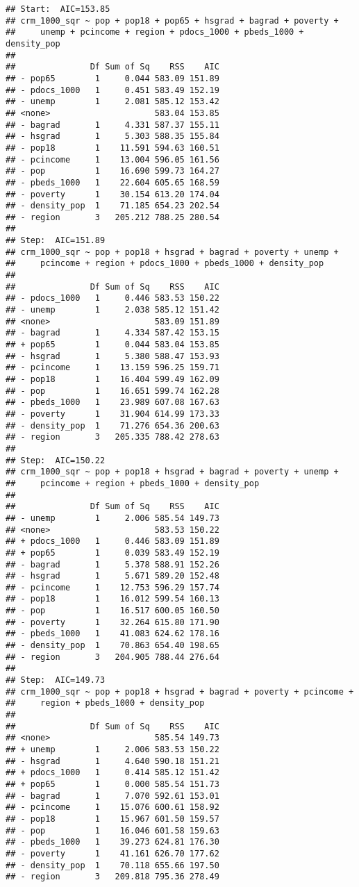 \documentclass[
]{article}
\begin{document}
\begin{verbatim}
## Start:  AIC=153.85
## crm_1000_sqr ~ pop + pop18 + pop65 + hsgrad + bagrad + poverty + 
##     unemp + pcincome + region + pdocs_1000 + pbeds_1000 + density_pop
## 
##               Df Sum of Sq    RSS    AIC
## - pop65        1     0.044 583.09 151.89
## - pdocs_1000   1     0.451 583.49 152.19
## - unemp        1     2.081 585.12 153.42
## <none>                     583.04 153.85
## - bagrad       1     4.331 587.37 155.11
## - hsgrad       1     5.303 588.35 155.84
## - pop18        1    11.591 594.63 160.51
## - pcincome     1    13.004 596.05 161.56
## - pop          1    16.690 599.73 164.27
## - pbeds_1000   1    22.604 605.65 168.59
## - poverty      1    30.154 613.20 174.04
## - density_pop  1    71.185 654.23 202.54
## - region       3   205.212 788.25 280.54
## 
## Step:  AIC=151.89
## crm_1000_sqr ~ pop + pop18 + hsgrad + bagrad + poverty + unemp + 
##     pcincome + region + pdocs_1000 + pbeds_1000 + density_pop
## 
##               Df Sum of Sq    RSS    AIC
## - pdocs_1000   1     0.446 583.53 150.22
## - unemp        1     2.038 585.12 151.42
## <none>                     583.09 151.89
## - bagrad       1     4.334 587.42 153.15
## + pop65        1     0.044 583.04 153.85
## - hsgrad       1     5.380 588.47 153.93
## - pcincome     1    13.159 596.25 159.71
## - pop18        1    16.404 599.49 162.09
## - pop          1    16.651 599.74 162.28
## - pbeds_1000   1    23.989 607.08 167.63
## - poverty      1    31.904 614.99 173.33
## - density_pop  1    71.276 654.36 200.63
## - region       3   205.335 788.42 278.63
## 
## Step:  AIC=150.22
## crm_1000_sqr ~ pop + pop18 + hsgrad + bagrad + poverty + unemp + 
##     pcincome + region + pbeds_1000 + density_pop
## 
##               Df Sum of Sq    RSS    AIC
## - unemp        1     2.006 585.54 149.73
## <none>                     583.53 150.22
## + pdocs_1000   1     0.446 583.09 151.89
## + pop65        1     0.039 583.49 152.19
## - bagrad       1     5.378 588.91 152.26
## - hsgrad       1     5.671 589.20 152.48
## - pcincome     1    12.753 596.29 157.74
## - pop18        1    16.012 599.54 160.13
## - pop          1    16.517 600.05 160.50
## - poverty      1    32.264 615.80 171.90
## - pbeds_1000   1    41.083 624.62 178.16
## - density_pop  1    70.863 654.40 198.65
## - region       3   204.905 788.44 276.64
## 
## Step:  AIC=149.73
## crm_1000_sqr ~ pop + pop18 + hsgrad + bagrad + poverty + pcincome + 
##     region + pbeds_1000 + density_pop
## 
##               Df Sum of Sq    RSS    AIC
## <none>                     585.54 149.73
## + unemp        1     2.006 583.53 150.22
## - hsgrad       1     4.640 590.18 151.21
## + pdocs_1000   1     0.414 585.12 151.42
## + pop65        1     0.000 585.54 151.73
## - bagrad       1     7.070 592.61 153.01
## - pcincome     1    15.076 600.61 158.92
## - pop18        1    15.967 601.50 159.57
## - pop          1    16.046 601.58 159.63
## - pbeds_1000   1    39.273 624.81 176.30
## - poverty      1    41.161 626.70 177.62
## - density_pop  1    70.118 655.66 197.50
## - region       3   209.818 795.36 278.49
\end{verbatim}
\end{document}
